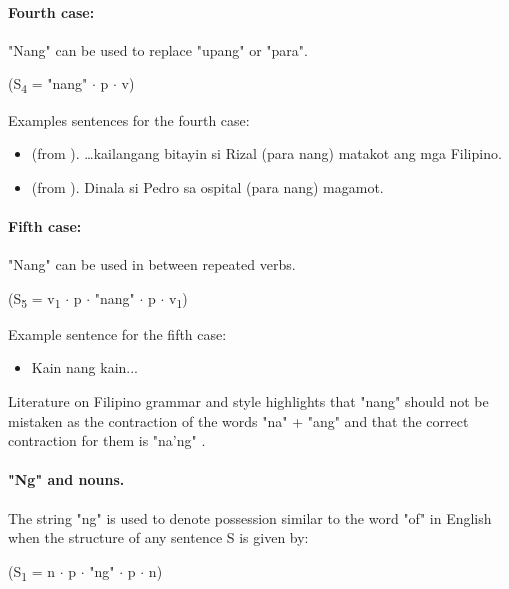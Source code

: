 \paragraph{Fourth case:} "Nang" can be used to replace "upang" or "para".
\begin{center}
      (S\textsubscript{4} = "nang" \(\cdot\) p \(\cdot\) v)
\end{center}

\begin{example}
      Examples sentences for the fourth case:
\end{example}
\begin{itemize}
      \item (from \cite{OOP}). …kailangang bitayin si Rizal (para {\textpipe} nang)
            matakot ang mga Filipino.
      \item (from \cite{OOP}). Dinala si Pedro sa ospital (para {\textpipe} nang)
            magamot.
\end{itemize}

\paragraph{Fifth case:} "Nang" can be used in between repeated verbs.
\begin{center}
      (S\textsubscript{5} = v\textsubscript{1} \(\cdot\) p \(\cdot\) "nang"
      \(\cdot\) p \(\cdot\) v\textsubscript{1})
\end{center}

\begin{example}
      Example sentence for the fifth case:
\end{example}
\begin{itemize}
      \item Kain nang kain...
\end{itemize}

Literature on Filipino grammar and style highlights that "nang" should not be
mistaken as the contraction of the words "na" + "ang" and that the correct
contraction for them is "na'ng" \cite{OOP}.

\paragraph{"Ng" and nouns.} The string "ng" is used to denote possession similar to
the word "of" in English when the structure of any sentence S is given by:

\begin{center}
      (S\textsubscript{1} = n \(\cdot\) p \(\cdot\) "ng" \(\cdot\) p \(\cdot\) n)
\end{center}

